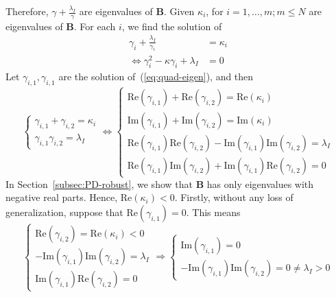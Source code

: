 Therefore, $\displaystyle \gamma + \frac{\lambda_I}{\gamma}$ are eigenvalues of $\bm{B}$. Given $\kappa_i$, for $i = 1, \dots, m; m \leq N$ are eigenvalues of $\bm{B}$. For each $i$, we find the solution of 
\begin{align}
\label{eq:quad-eigen}
    \gamma_i + \frac{\lambda_I}{\gamma_i} &= \kappa_i\\
    \iff \gamma_i^2 -\kappa \gamma_i + \lambda_I &= 0
\end{align}
Let $\gamma_{i, 1}, \gamma_{i, 1}$ are the solution of~(\ref{eq:quad-eigen}), and then 
\begin{equation}
\label{eq:condition-real}
    \begin{cases}
        \gamma_{i, 1} + \gamma_{i, 2} = \kappa_i\\
        \gamma_{i, 1}\gamma_{i, 2} = \lambda_I
    \end{cases}
    \iff \begin{cases}
        \mathrm{Re}(\gamma_{i, 1}) + \mathrm{Re}(\gamma_{i, 2}) = \mathrm{Re}(\kappa_i)\\
        \mathrm{Im}(\gamma_{i, 1}) + \mathrm{Im}(\gamma_{i, 2}) = \mathrm{Im}(\kappa_i)\\
        \mathrm{Re}(\gamma_{i, 1})\mathrm{Re}(\gamma_{i, 2}) - \mathrm{Im}(\gamma_{i, 1})\mathrm{Im}(\gamma_{i, 2}) = \lambda_I\\
        \mathrm{Re}(\gamma_{i, 1})\mathrm{Im}(\gamma_{i, 2}) + \mathrm{Im}(\gamma_{i, 1})\mathrm{Re}(\gamma_{i, 2}) = 0
    \end{cases}
\end{equation}
In Section~\ref{subsec:PD-robust}, we show that $\bm{B}$ has only eigenvalues with negative real parts. Hence, $\mathrm{Re}(\kappa_i) < 0$. 
Firstly, without any loss of generalization, suppose that $\mathrm{Re}(\gamma_{i, 1}) = 0$. This means
\begin{equation}
    \begin{cases}
        \mathrm{Re}(\gamma_{i, 2}) = \mathrm{Re}(\kappa_i) < 0\\
        - \mathrm{Im}(\gamma_{i, 1})\mathrm{Im}(\gamma_{i, 2}) = \lambda_I\\
        \mathrm{Im}(\gamma_{i, 1})\mathrm{Re}(\gamma_{i, 2}) = 0
    \end{cases}
    \Rightarrow \begin{cases}
        \mathrm{Im}(\gamma_{i, 1}) = 0\\
        - \mathrm{Im}(\gamma_{i, 1})\mathrm{Im}(\gamma_{i, 2}) = 0 \neq \lambda_I > 0
    \end{cases}
\end{equation}
